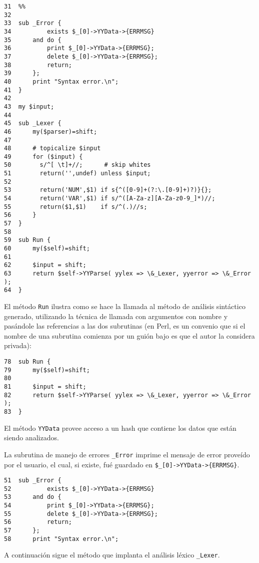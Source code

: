\begin{verbatim}
31  %%
32
33  sub _Error {
34          exists $_[0]->YYData->{ERRMSG}
35      and do {
36          print $_[0]->YYData->{ERRMSG};
37          delete $_[0]->YYData->{ERRMSG};
38          return;
39      };
40      print "Syntax error.\n";
41  }
42
43  my $input;
44
45  sub _Lexer {
46      my($parser)=shift;
47
48      # topicalize $input
49      for ($input) {
50        s/^[ \t]+//;      # skip whites
51        return('',undef) unless $input;
52
53        return('NUM',$1) if s{^([0-9]+(?:\.[0-9]+)?)}{};
54        return('VAR',$1) if s/^([A-Za-z][A-Za-z0-9_]*)//;
55        return($1,$1)    if s/^(.)//s;
56      }
57  }
58
59  sub Run {
60      my($self)=shift;
61
62      $input = shift;
63      return $self->YYParse( yylex => \&_Lexer, yyerror => \&_Error );
64  }
\end{verbatim}


El método \verb|Run|
ilustra como se hace la llamada al método de análisis sintáctico 
generado, utilizando la técnica de llamada con argumentos con nombre 
y pasándole las referencias a las dos subrutinas (en Perl,
es un convenio que si el nombre de una subrutina comienza
por un guión bajo es que el autor la considera privada):
\begin{verbatim}
78  sub Run {
79      my($self)=shift;
80
81      $input = shift;
82      return $self->YYParse( yylex => \&_Lexer, yyerror => \&_Error );
83  }
\end{verbatim}


El método \verb|YYData| provee acceso a un hash que contiene los datos 
que están siendo analizados. 

La subrutina de manejo de errores \verb|_Error| imprime 
el mensaje de error proveído por el usuario, el cual, si existe, fué guardado en
\verb|$_[0]->YYData->{ERRMSG}|.
\begin{verbatim}
51  sub _Error {
52          exists $_[0]->YYData->{ERRMSG}
53      and do {
54          print $_[0]->YYData->{ERRMSG};
55          delete $_[0]->YYData->{ERRMSG};
56          return;
57      };
58      print "Syntax error.\n";
\end{verbatim}

\label{parrafo:lexerparaeyapp}

A continuación sigue el método que implanta
el  análisis léxico \verb|_Lexer|.

